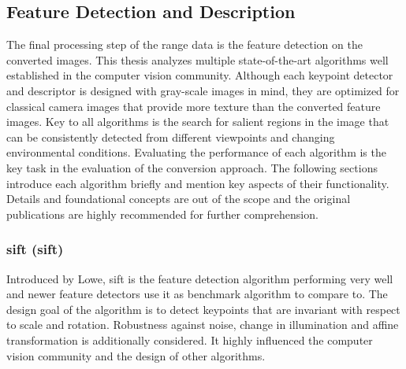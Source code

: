 \subsection{Feature Detection and Description}
\label{sec:feature_algorithms}

The final processing step of the range data is the feature detection on the converted images.
This thesis analyzes multiple state-of-the-art algorithms well established in the computer vision community.
Although each keypoint detector and descriptor is designed with gray-scale images in mind, they are optimized for classical camera images that provide more texture than the converted feature images.
Key to all algorithms is the search for salient regions in the image that can be consistently detected from different viewpoints and changing environmental conditions.
Evaluating the performance of each algorithm is the key task in the evaluation of the conversion approach.
The following sections introduce each algorithm briefly and mention key aspects of their functionality.
Details and foundational concepts are out of the scope and the original publications are highly recommended for further comprehension.

\subsubsection{\acrshort{sift} (\acrlong{sift})}

Introduced by Lowe\cite{lowe_iccv99,lowe_ijcv04}, \acrshort{sift} is the feature detection algorithm performing very well and newer feature detectors use it as benchmark algorithm to compare to.
The design goal of the algorithm is to detect keypoints that are invariant with respect to scale and rotation.
Robustness against noise, change in illumination and affine transformation is additionally considered.
It highly influenced the computer vision community and the design of other algorithms.

